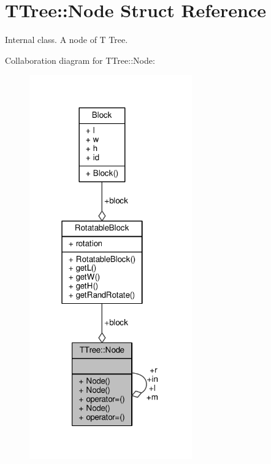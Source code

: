 \hypertarget{structTTree_1_1Node}{}\section{T\+Tree\+:\+:Node Struct Reference}
\label{structTTree_1_1Node}


Internal class. A node of T Tree.  




Collaboration diagram for T\+Tree\+:\+:Node\+:
\nopagebreak
\begin{figure}[H]
\begin{center}
\leavevmode
\includegraphics[width=199pt]{structTTree_1_1Node__coll__graph}
\end{center}
\end{figure}
